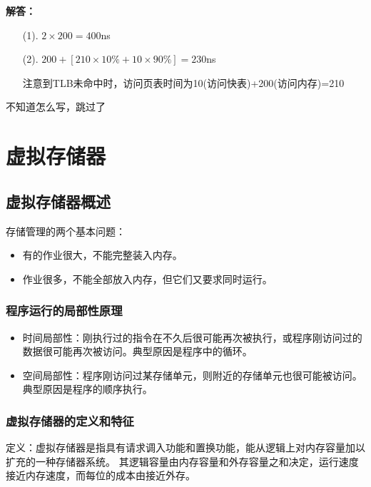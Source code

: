\documentclass[12pt, a4paper, oneside]{ctexart}
\newenvironment{solution}{\begin{shaded}\par\noindent\textbf{解答：}}{\end{shaded}\par}
\begin{document}
\begin{solution}
    \begin{enumerate}
        \item [(1). ] $2\times 200=400$ns
        \item [(2). ] $200+[210\times 10\%+10\times 90\%]=230$ns
        
        注意到TLB未命中时，访问页表时间为10(访问快表)+200(访问内存)=210
    \end{enumerate}
\end{solution}

不知道怎么写，跳过了

\newpage
\section{虚拟存储器}

\subsection{虚拟存储器概述}

存储管理的两个基本问题：
\begin{itemize}
    \item 有的作业很大，不能完整装入内存。
    \item 作业很多，不能全部放入内存，但它们又要求同时运行。
\end{itemize}

\subsubsection{程序运行的局部性原理}

\begin{itemize}
    \item 时间局部性：刚执行过的指令在不久后很可能再次被执行，或程序刚访问过的数据很可能再次被访问。典型原因是程序中的循环。
    \item 空间局部性：程序刚访问过某存储单元，则附近的存储单元也很可能被访问。典型原因是程序的顺序执行。
\end{itemize}

\subsubsection{虚拟存储器的定义和特征}

定义：虚拟存储器是指具有请求调入功能和置换功能，能从逻辑上对内存容量加以扩充的一种存储器系统。
其逻辑容量由内存容量和外存容量之和决定，运行速度接近内存速度，而每位的成本由接近外存。
\end{document}

